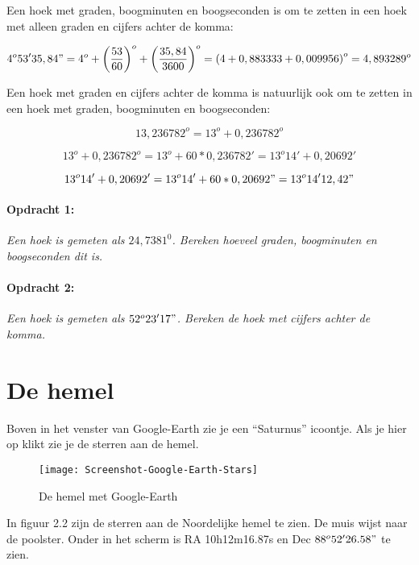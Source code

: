Een hoek met graden, boogminuten en boogseconden is om te zetten in
een hoek met alleen graden en cijfers achter de komma:

\[
4^{o}53'35,84"=4^{o}+\left(\frac{53}{60}\right)^{o}+\left(\frac{35,84}{3600}\right)^{o}
=\left(4+0,883333+0,009956\right)^{o}=4,893289^{o}
\]


Een hoek met graden en cijfers achter de komma is natuurlijk ook om
te zetten in een hoek met graden, boogminuten en boogseconden:

\[
13,236782^{o}=13^{o}+0,236782^{o}
\]


\[
13^{o}+0,236782^{o}=13^{o}+60*0,236782'=13^{o}14'+0,20692'
\]


\[
13^{o}14'+0,20692'=13^{o}14'+60*0,20692"=13^{o}14'12,42"
\]


\paragraph*{Opdracht 1:}

\emph{Een hoek is gemeten als $24,7381^{0}$. Bereken hoeveel graden,
boogminuten en boogseconden dit is.}


\paragraph*{Opdracht 2:}

\emph{Een hoek is gemeten als $52^{o}23'17"$. Bereken de hoek met
cijfers achter de komma.}


\section{De hemel}

Boven in het venster van Google-Earth zie je een ``Saturnus'' icoontje.
Als je hier op klikt zie je de sterren aan de hemel.

\begin{figure}[H]
\noindent \begin{centering}
\texttt{[image: Screenshot-Google-Earth-Stars]}
\par\end{centering}

\caption{De hemel met Google-Earth}
\end{figure}


In figuur 2.2 zijn de sterren aan de Noordelijke hemel te zien. De
muis wijst naar de poolster. Onder in het scherm is RA 10h12m16.87s
en Dec $88^{o}52'26.58"$ te zien. 

